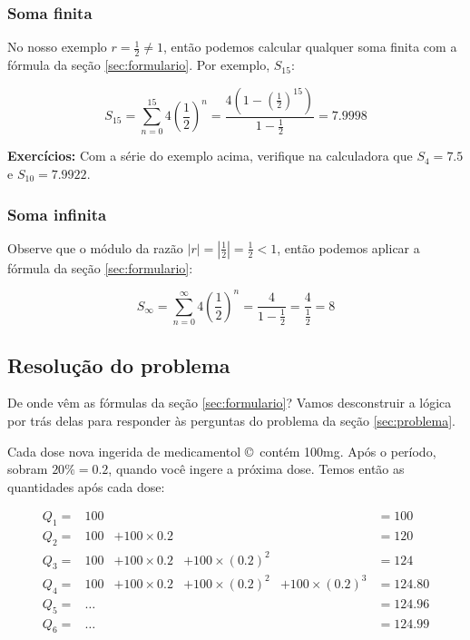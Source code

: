 \documentclass[a4paper]{article}
\begin{document}
\subsubsection{Soma finita}

No nosso exemplo $r = \frac{1}{2} \ne 1$, então podemos calcular
qualquer soma finita com a fórmula da seção \ref{sec:formulario}. Por
exemplo, $S_{15}$:

\begin{displaymath}
  S_{15} = \sum_{n=0}^{15} 4\left(\frac{1}{2}\right)^n =
  \frac{4\left(1-\left(\frac{1}{2}\right)^{15}\right)}{1-\frac{1}{2}} = 7.9998
\end{displaymath}

{\bf Exercícios:} Com a série do exemplo acima, verifique na
calculadora que $S_4=7.5$ e $S_{10}=7.9922$.

\subsubsection{Soma infinita}

Observe que o módulo da razão
$|r|=\left|\frac{1}{2}\right|=\frac{1}{2} <1$, então podemos aplicar a
fórmula da seção \ref{sec:formulario}:

\begin{displaymath}
  S_\infty = \sum_{n=0}^\infty 4\left(\frac{1}{2}\right)^n =
  \frac{4}{1-\frac{1}{2}} = \frac{4}{\frac{1}{2}} = 8
\end{displaymath}

\subsection{Resolução do problema}
\label{sec:resolucao}

De onde vêm as fórmulas da seção \ref{sec:formulario}? Vamos
desconstruir a lógica por trás delas para responder às perguntas do
problema da seção \ref{sec:problema}.

Cada dose nova ingerida de medicamentol \copyright\ contém 100mg. Após
o período, sobram $20\%=0.2$, quando você ingere a próxima dose. Temos
então as quantidades após cada dose:

\begin{displaymath}
  \begin{array}{cccccl}
    Q_1=&100&&&&=100 \\
    Q_2=&100&+100\times 0.2&&&=120 \\
    Q_3=&100&+100\times 0.2&+100\times (0.2)^2&&=124\\
    Q_4=&100&+100\times 0.2&+100\times (0.2)^2&+100\times(0.2)^3&=124.80 \\
    Q_5=&\ldots &&&&=124.96\\
    Q_6=&\ldots&&&&=124.99
  \end{array}
\end{displaymath}
\end{document}
